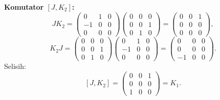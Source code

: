 \vspace{0.5em}
\noindent \textbf{Komutator $[J, K_2]$:}
\begin{equation}
    JK_2 = \begin{pmatrix}0&1&0\\-1&0&0\\0&0&0\end{pmatrix}\!\begin{pmatrix}0&0&0\\0&0&1\\0&1&0\end{pmatrix}
    = \begin{pmatrix}0&0&1\\0&0&0\\0&0&0\end{pmatrix},
\end{equation}
\begin{equation}
    K_2 J = \begin{pmatrix}0&0&0\\0&0&1\\0&1&0\end{pmatrix}\!\begin{pmatrix}0&1&0\\-1&0&0\\0&0&0\end{pmatrix}
    = \begin{pmatrix}0&0&0\\0&0&0\\-1&0&0\end{pmatrix}.
\end{equation}
Selisih:
\begin{equation}\label{a2-eq:JK2}
    [J, K_2] = \begin{pmatrix}0&0&1\\0&0&0\\1&0&0\end{pmatrix} = K_1.
\end{equation}

